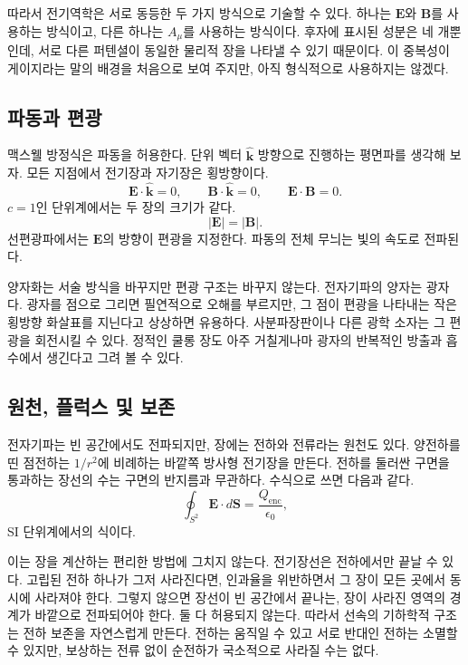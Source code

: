 따라서 전기역학은 서로 동등한 두 가지 방식으로 기술할 수 있다. 하나는 \(\boldsymbol E\)와 \(\boldsymbol B\)를 사용하는 방식이고, 다른 하나는 \(A_\mu\)를 사용하는 방식이다. 후자에 표시된 성분은 네 개뿐인데, 서로 다른 퍼텐셜이 동일한 물리적 장을 나타낼 수 있기 때문이다. 이 중복성이 게이지라는 말의 배경을 처음으로 보여 주지만, 아직 형식적으로 사용하지는 않겠다.

\subsection{파동과 편광}

맥스웰 방정식은 파동을 허용한다. 단위 벡터 \(\hat{\boldsymbol k}\) 방향으로 진행하는 평면파를 생각해 보자. 모든 지점에서 전기장과 자기장은 횡방향이다.
\begin{equation}
\boldsymbol E\cdot\hat{\boldsymbol k}=0,
\qquad
\boldsymbol B\cdot\hat{\boldsymbol k}=0,
\qquad
\boldsymbol E\cdot\boldsymbol B=0.
\end{equation} \(c=1\)인 단위계에서는 두 장의 크기가 같다.
\begin{equation}
|\boldsymbol E|=|\boldsymbol B|.
\end{equation} 선편광파에서는 \(\boldsymbol E\)의 방향이 편광을 지정한다. 파동의 전체 무늬는 빛의 속도로 전파된다.

양자화는 서술 방식을 바꾸지만 편광 구조는 바꾸지 않는다. 전자기파의 양자는 광자다. 광자를 점으로 그리면 필연적으로 오해를 부르지만, 그 점이 편광을 나타내는 작은 횡방향 화살표를 지닌다고 상상하면 유용하다. 사분파장판이나 다른 광학 소자는 그 편광을 회전시킬 수 있다. 정적인 쿨롱 장도 아주 거칠게나마 광자의 반복적인 방출과 흡수에서 생긴다고 그려 볼 수 있다.

\subsection{원천, 플럭스 및 보존}

전자기파는 빈 공간에서도 전파되지만, 장에는 전하와 전류라는 원천도 있다. 양전하를 띤 점전하는 \(1/r^2\)에 비례하는 바깥쪽 방사형 전기장을 만든다. 전하를 둘러싼 구면을 통과하는 장선의 수는 구면의 반지름과 무관하다. 수식으로 쓰면 다음과 같다.
\begin{equation}
\oint_{S^2}\boldsymbol E\cdot d\boldsymbol S
=\frac{Q_{\mathrm{enc}}}{\epsilon_0},
\label{eq:l5-gauss}
\end{equation} SI 단위계에서의 식이다.

이는 장을 계산하는 편리한 방법에 그치지 않는다. 전기장선은 전하에서만 끝날 수 있다. 고립된 전하 하나가 그저 사라진다면, 인과율을 위반하면서 그 장이 모든 곳에서 동시에 사라져야 한다. 그렇지 않으면 장선이 빈 공간에서 끝나는, 장이 사라진 영역의 경계가 바깥으로 전파되어야 한다. 둘 다 허용되지 않는다. 따라서 선속의 기하학적 구조는 전하 보존을 자연스럽게 만든다. 전하는 움직일 수 있고 서로 반대인 전하는 소멸할 수 있지만, 보상하는 전류 없이 순전하가 국소적으로 사라질 수는 없다.

